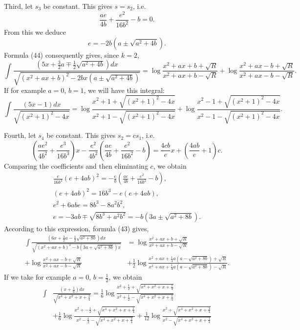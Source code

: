 \documentclass[oneside, 12 pt, leqno]{memoir}
\begin{document}
Third, let \(s_3\) be constant.  This gives \(s=s_2\), i.e.
\[\frac{a e}{4 b}+\frac{e^2}{16 b^2}-b=0.\]
From this we deduce
\[e=-2 b\left(a \pm \sqrt{a^2+4 b}\right).\]
Formula (44) consequently gives, since \(k=2\),
\[\int \frac{\left(5 x+\frac{3}{2} a \mp \frac{1}{2} \sqrt{a^2+4 b}\right) d x}{\sqrt{\left(x^2+a x+b\right)^2-2 b x\left(a \pm \sqrt{a^2+4 b}\right)}}
=\log \frac{x^2+a x+b+\sqrt{R}}{x^2+a x+b-\sqrt{R}}+\log \frac{x^2+a x-b+\sqrt{R}}{x^2+a x-b-\sqrt{R}}.\]
If for example \(a=0\), \(b=1\), we will have this integral:
\[\int \frac{(5 x-1) d x}{\sqrt{\left(x^2+1\right)^2-4 x}}=\log \frac{x^2+1+\sqrt{\left(x^2+1\right)^2-4 x}}{x^2+1-\sqrt{\left(x^2+1\right)^2-4 x}}+\log \frac{x^2-1+\sqrt{\left(x^2+1\right)^2-4 x}}{x^2-1-\sqrt{\left(x^2+1\right)^2-4 x}}.\]

Fourth, let \(s_4\) be constant. This gives \(s_2=c s_1\), i.e.
\[\left(\frac{a e^2}{4 b^2}+\frac{e^3}{16 b^3}\right) x-\frac{e^2}{4 b^2}\left(\frac{a e}{4 b}+\frac{e^2}{16 b^2}-b\right)=\frac{4 c b}{e} x+\left(\frac{4 a b}{e}+1\right) c.\]
Comparing the coefficients and then eliminating \(c\), we obtain
\[\begin{gathered}
\frac{e}{16 b^3}(e+4 a b)^2=-\frac{e}{b}\left(\frac{a e}{4 b}+\frac{e^2}{16 b^2}-b\right),\\
(e+4 a b)^2=16 b^3-e(e+4 a b), \\
e^2+6 a b e=8 b^3-8 a^2 b^2, \\
e=-3 a b \mp \sqrt{8 b^3+a^2 b^2}=-b\left(3 a \pm \sqrt{a^2+8 b}\right).
\end{gathered}\]
According to this expression, formula (43) gives,
\[\begin{aligned}
\int \frac{\left(6 x+\frac{3}{2} a-\frac{1}{2} \sqrt{a^2+8 b}\right) d x}{\sqrt{\left(x^2+a x+b\right)^2-b\left(3 a+\sqrt{a^2+8 b}\right) x}}&=\log \frac{x^2+a x+b+\sqrt{R}}{x^2+a x+b-\sqrt{R}} \\
+\log \frac{x^2+a x-b+\sqrt{R}}{x^2+a x-b-\sqrt{R}}&+\frac{1}{2} \log \frac{x^2+a x+\frac{1}{4} a\left(a-\sqrt{a^2+8 b}\right)+\sqrt{R}}{x^2+a x+\frac{1}{4} a\left(a-\sqrt{a^2+8 b}\right)-\sqrt{R}}.
\end{aligned}\]
If we take for example \(a=0\), \(b=\frac{1}{2}\), we obtain
\[ \begin{aligned} \int &\frac{\left(x+\frac{1}{6}\right)dx}{\sqrt{x^4+x^2+x+\frac{1}{4}}} = \frac{1}{6} \log \frac{x^2 + \frac{1}{2} + \sqrt{x^4+x^2+x+\frac{1}{4}}}{x^2 + \frac{1}{2} - \sqrt{x^4+x^2+x+\frac{1}{4}}} \\
&+  \frac{1}{6} \log \frac{x^2 + -\frac{1}{2} + \sqrt{x^4+x^2+x+\frac{1}{4}}}{x^2 - \frac{1}{2} - \sqrt{x^4+x^2+x+\frac{1}{4}}} + \frac{1}{12} \log \frac{x^2 + \sqrt{x^4+x^2+x+\frac{1}{4}}}{x^2 - \sqrt{x^4+x^2+x+\frac{1}{4}}} 
\end{aligned}\]
\end{document}

